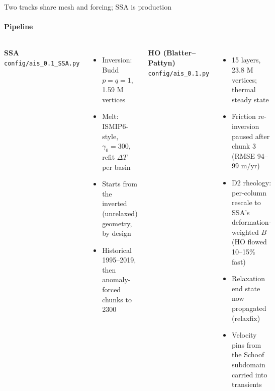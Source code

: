 \documentclass[aspectratio=169,10pt]{beamer}
\newcommand{\serif}{\fontfamily{qpl}\selectfont}
\begin{document}
\begin{frame}{Two tracks share mesh and forcing; SSA is production}
\framesubtitle{Pipeline}
\vspace{2mm}\small
\begin{columns}[T]
{\serif\large\bfseries\color{navy}SSA} \hfill {\scriptsize\color{faint}\texttt{config/ais\_0.1\_SSA.py}}
\begin{itemize}
\item Inversion: Budd $p=q=1$, 1.59 M vertices
\item Melt: ISMIP6-style, $\gamma_0=300$, refit $\Delta T$ per basin
\item Starts from the inverted (unrelaxed) geometry, by design
\item Historical 1995--2019, then anomaly-forced chunks to 2300
\end{itemize}
{\serif\large\bfseries\color{navy}HO (Blatter--Pattyn)} \hfill {\scriptsize\color{faint}\texttt{config/ais\_0.1.py}}
\begin{itemize}
\item 15 layers, 23.8 M vertices; thermal steady state
\item Friction re-inversion paused after chunk 3 (RMSE 94--99 m/yr)
\item D2 rheology: per-column rescale to SSA's deformation-weighted $B$ (HO flowed 10--15\% fast)
\item Relaxation end state now propagated (relaxfix)
\item Velocity pins from the Schoof subdomain carried into transients
\end{itemize}
\end{columns}
\end{frame}
\end{document}
